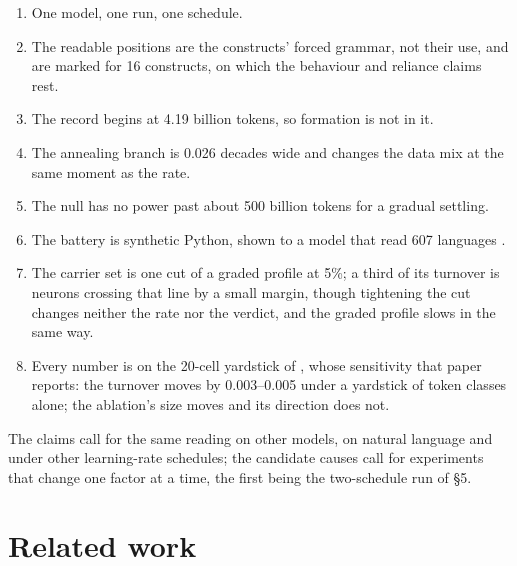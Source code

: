 \documentclass{article}
\begin{document}
\begin{enumerate}[topsep=2pt,itemsep=1pt,parsep=0pt,partopsep=0pt,leftmargin=*]
\item One model, one run, one schedule.
\item The readable positions are the constructs' forced grammar, not their use, and are marked for 16 constructs, on which the behaviour and reliance claims rest.
\item The record begins at 4.19 billion tokens, so formation is not in it.
\item The annealing branch is 0.026 decades wide and changes the data mix at the same moment as the rate.
\item The null has no power past about 500 billion tokens for a gradual settling.
\item The battery is synthetic Python, shown to a model that read 607 languages \citep{huang2024}.
\item The carrier set is one cut of a graded profile at 5\%; a third of its turnover is neurons crossing that line by a small margin, though tightening the cut changes neither the rate nor the verdict, and the graded profile slows in the same way.
\item Every number is on the 20-cell yardstick of \citet{wilam2026}, whose sensitivity that paper reports: the turnover moves by 0.003--0.005 under a yardstick of token classes alone; the ablation's size moves and its direction does not.
\end{enumerate}

The claims call for the same reading on other models, on natural language and under other learning-rate schedules; the candidate causes call for experiments that change one factor at a time, the first being the two-schedule run of \S5.

\section{Related work}
\end{document}
